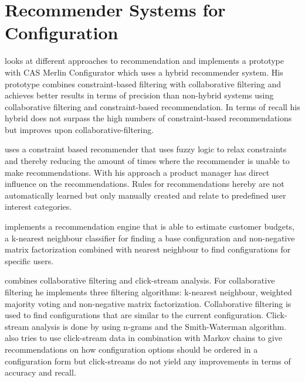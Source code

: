 \section{Recommender Systems for Configuration}
\label{sec:Related_Work:RecommenderSystemsForConfiguration}
\begin{description}[style=unboxed, leftmargin=0cm, font=\normalfont]
    \item[\citeauthor{rubinshteynEntwicklungHybridenRecommender2018} \cite{rubinshteynEntwicklungHybridenRecommender2018}] looks at different approaches to recommendation and implements a prototype with CAS Merlin Configurator which uses a hybrid recommender system. His prototype combines constraint-based filtering with collaborative filtering and achieves better results in terms of precision than non-hybrid systems using collaborative filtering and constraint-based recommendation. In terms of recall his hybrid does not surpass the high numbers of constraint-based recommendations but improves upon collaborative-filtering. 

    \item [\citeauthor{benzMoeglichkeitenIntelligenterEmpfehlungssysteme2017} \cite{benzMoeglichkeitenIntelligenterEmpfehlungssysteme2017}] uses a constraint based recommender that uses fuzzy logic to relax constraints and thereby reducing the amount of times where the recommender is unable to make recommendations. With his approach a product manager has direct influence on the recommendations. Rules for recommendations hereby are not automatically learned but only manually created and relate to predefined user interest categories.

    \item [\citeauthor{ullmannEntwurfUndUmsetzung2017} \cite{ullmannEntwurfUndUmsetzung2017}] implements a recommendation engine that is able to estimate customer budgets, a k-nearest neighbour classifier for finding a base configuration and non-negative matrix factorization combined with nearest neighbour to find configurations for specific users. \par

    \item[\citeauthor{wetzelPersonalisierterUndLernender2017} \cite{wetzelPersonalisierterUndLernender2017}] combines collaborative filtering and click-stream analysis. For collaborative filtering he implements three filtering algorithms: k-nearest neighbour, weighted majority voting and non-negative matrix factorization. Collaborative filtering is used to find configurations that are similar to the current configuration. Click-stream analysis is done by using n-grams and the Smith-Waterman algorithm. \citeauthor{wetzelPersonalisierterUndLernender2017} also tries to use click-stream data in combination with Markov chains to give recommendations on how configuration options should be ordered in a configuration form but click-streams do not yield any improvements in terms of accuracy and recall.


\end{description}
